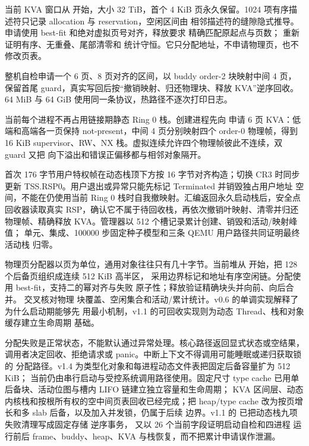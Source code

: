 当前 KVA 窗口从  开始，大小 32 TiB，首个 4 KiB
页永久保留。1024 项有序描述符只记录 allocation 与 reservation，空闲区间由
相邻描述符的缝隙隐式推导。申请使用 best-fit 和绝对虚拟页号对齐，释放要求
精确匹配原起点与页数； 重新证明有序、无重叠、尾部清零和
统计守恒。它只分配地址，不申请物理页，也不修改页表。

整机自检申请一个 6 页、8 页对齐的区间，以 buddy order-2 块映射中间 4 页，
保留首尾 guard，真实写回后按“撤销映射、归还物理块、释放 KVA”逆序回收。
64 MiB 与 64 GiB 使用同一条协议，热路径不逐次打印日志。

当前每个进程不再占用链接期静态 Ring 0 栈。创建进程先向
 申请 6 页 KVA：低端和高端各一页保持
not-present，中间 4 页分别映射四个 order-0 物理帧，得到 16 KiB
supervisor、RW、NX 栈。虚拟连续允许四个物理帧彼此不连续，双 guard 又把
向下溢出和错误正偏移都与相邻对象隔开。

首次 176 字节用户特权帧在动态栈顶下方按 16 字节对齐构造；切换 CR3 时同步
更新 TSS.RSP0。用户退出或异常只能先标记 Terminated 并销毁独占用户地址
空间，不能在仍使用当前 Ring 0 栈时自我撤映射。汇编返回永久启动栈后，安全点
回收器读取真实 RSP，确认它不属于待回收栈，再依次撤销叶映射、清零并归还
物理帧、精确释放 KVA。管理器以 512 个槽记录累计创建、销毁和活动/映射峰值；
单元、集成、100000 步固定种子模型和三条 QEMU 用户路径共同证明最终活动栈
归零。

物理页分配器以页为单位，通用对象往往只有几十字节。当前堆从
 开始，把 128 个后备页组织成连续 512 KiB 高半区，
采用边界标记和地址有序空闲链。分配使用 best-fit，支持二的幂对齐与失败
原子性；释放验证精确块头并向前、向后合并。 交叉核对物理
块覆盖、空闲集合和活动/累计统计。v0.6 的单调实现解释了为什么启动期能够先
用最小机制，v1.1 的可回收实现则为动态 Thread、栈和对象缓存建立生命周期
基础。

分配失败是正常状态，不能默认通过异常处理。核心路径返回显式状态或空结果，
调用者决定回收、拒绝请求或 panic。中断上下文不得调用可能睡眠或递归获取锁的
分配路径。v1.4 为类型化对象和每进程动态文件表把固定后备容量扩为 512 KiB；
当前仍由串行启动与受控系统调用路径使用。固定尺寸
type cache 已用单后备块、活动位图与槽内 LIFO 链建立独立容量和生命周期；
KVA 区间层、动态内核栈和按根所有权的空中间页表回收已经完成；把
heap/type cache 改为按页增长和多 slab 后备，以及加入并发锁，仍属于后续
边界。v1.1 的  已把动态栈九项失败清理写成固定存储
逆序事务， 又以 26 个当前字段证明启动自检和四进程
运行前后 frame、buddy、heap、KVA 与栈恢复，而不把累计申请误作泄漏。
